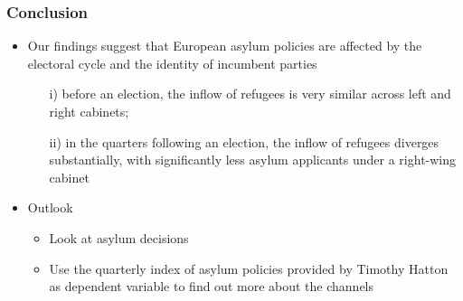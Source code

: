 \documentclass[compress, xcolor = {table,xcdraw}]{beamer}
\begin{document}
\begin{frame}
\frametitle{Conclusion}
\begin{itemize}
\item Our findings suggest that European asylum policies are affected by the electoral cycle and the identity of incumbent parties
\begin{itemize}
	\item[i)]before an election, the inflow of refugees is very similar across left and right cabinets;
	\item[ii)]in the quarters following an election, the inflow of refugees diverges substantially, with significantly less asylum applicants under a right-wing cabinet
\end{itemize}
\smallskip

\item Outlook
\begin{itemize}
	\item Look at asylum decisions
	\item Use the quarterly index of asylum policies provided by Timothy Hatton as dependent variable to find out more about the channels
\end{itemize}
\end{itemize}
\end{frame}
\end{document}
